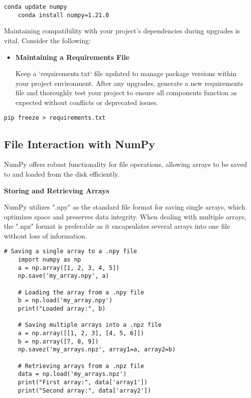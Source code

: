 \begin{lstlisting}[caption={Commands to update or install a specific version of NumPy using conda}, label={code:conda-install-numpy}, style=pythonstyle]
	conda update numpy
	conda install numpy=1.21.0
\end{lstlisting}

Maintaining compatibility with your project's dependencies during upgrades is vital. Consider the following:

\begin{itemize}
	\item \textbf{Maintaining a Requirements File}
	
	Keep a `requirements.txt` file updated to manage package versions within your project environment. After any upgrades, generate a new requirements file and thoroughly test your project to ensure all components function as expected without conflicts or deprecated issues.
\end{itemize}	

\begin{lstlisting}[caption={Command to export installed packages to a requirements.txt file}, label={code:pip-freeze-requirements}, style=pythonstyle]
		pip freeze > requirements.txt
\end{lstlisting}
	
	
\subsection{File Interaction with NumPy}
NumPy offers robust functionality for file operations, allowing arrays to be saved to and loaded from the disk efficiently.

\textbf{Storing and Retrieving Arrays}

NumPy utilizes ".npy" as the standard file format for saving single arrays, which optimizes space and preserves data integrity. When dealing with multiple arrays, the ".npz" format is preferable as it encapsulates several arrays into one file without loss of information.

\begin{lstlisting}[caption={Example code to save and load arrays in .npy and .npz formats}, label={code:numpy-save-load-arrays}, style=pythonstyle]
	# Saving a single array to a .npy file
	import numpy as np
	a = np.array([1, 2, 3, 4, 5])
	np.save('my_array.npy', a)
	
	# Loading the array from a .npy file
	b = np.load('my_array.npy')
	print("Loaded array:", b)
	
	# Saving multiple arrays into a .npz file
	a = np.array([[1, 2, 3], [4, 5, 6]])
	b = np.array([7, 8, 9])
	np.savez('my_arrays.npz', array1=a, array2=b)
	
	# Retrieving arrays from a .npz file
	data = np.load('my_arrays.npz')
	print("First array:", data['array1'])
	print("Second array:", data['array2'])
\end{lstlisting}

